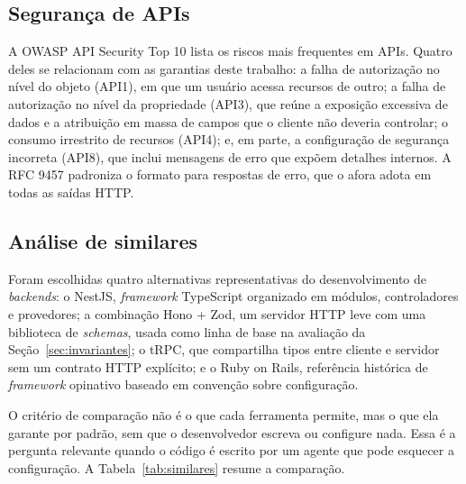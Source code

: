 \documentclass[a4paper,12pt]{article}
\newcommand{\estr}[1]{\textit{#1}}
\begin{document}
\subsection{Segurança de APIs}

A OWASP API Security Top 10 \citep{owasp2023} lista os riscos mais frequentes em APIs. Quatro deles se relacionam com as garantias deste trabalho: a falha de autorização no nível do objeto (API1), em que um usuário acessa recursos de outro; a falha de autorização no nível da propriedade (API3), que reúne a exposição excessiva de dados e a atribuição em massa de campos que o cliente não deveria controlar; o consumo irrestrito de recursos (API4); e, em parte, a configuração de segurança incorreta (API8), que inclui mensagens de erro que expõem detalhes internos. A RFC 9457 \citep{rfc9457} padroniza o formato  para respostas de erro, que o afora adota em todas as saídas HTTP.

\subsection{Análise de similares}\label{sec:similares}

Foram escolhidas quatro alternativas representativas do desenvolvimento de \estr{backends}: o NestJS, \estr{framework} TypeScript organizado em módulos, controladores e provedores; a combinação Hono + Zod, um servidor HTTP leve com uma biblioteca de \estr{schemas}, usada como linha de base na avaliação da Seção~\ref{sec:invariantes}; o tRPC, que compartilha tipos entre cliente e servidor sem um contrato HTTP explícito; e o Ruby on Rails, referência histórica de \estr{framework} opinativo baseado em convenção sobre configuração.

O critério de comparação não é o que cada ferramenta permite, mas o que ela garante por padrão, sem que o desenvolvedor escreva ou configure nada. Essa é a pergunta relevante quando o código é escrito por um agente que pode esquecer a configuração. A Tabela~\ref{tab:similares} resume a comparação.
\end{document}
